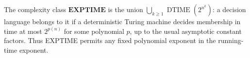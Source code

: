 
The complexity class $\mathbf{EXPTIME}$ is the union $\bigcup_{k\ge1}\operatorname{DTIME}(2^{n^k})$: a decision language belongs to it if a deterministic Turing machine decides membership in time at most $2^{p(n)}$ for some polynomial $p$, up to the usual asymptotic constant factors. Thus EXPTIME permits any fixed polynomial exponent in the running-time exponent.
